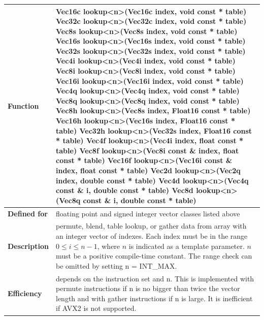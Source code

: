 \documentclass[vcl_manual.tex]{subfiles}
\begin{document}
\begin{tabular}{|p{30mm}|p{120mm}|}
\hline
\bfseries Function &
Vec16c lookup\textless n\textgreater(Vec16c index, void const * table) \newline
Vec32c lookup\textless n\textgreater(Vec32c index, void const * table) \newline
Vec8s lookup\textless n\textgreater(Vec8s index, void const * table) \newline
Vec16s lookup\textless n\textgreater(Vec16s index, void const * table) \newline
Vec32s lookup\textless n\textgreater(Vec32s index, void const * table) \newline
Vec4i lookup\textless n\textgreater(Vec4i index, void const * table) \newline
Vec8i lookup\textless n\textgreater(Vec8i index, void const * table) \newline
Vec16i lookup\textless n\textgreater(Vec16i index, void const * table) \newline
Vec4q lookup\textless n\textgreater(Vec4q index, void const * table) \newline
Vec8q lookup\textless n\textgreater(Vec8q index, void const * table) \newline
Vec8h lookup\textless n\textgreater(Vec8s index, Float16 const * table) \newline
Vec16h lookup\textless n\textgreater(Vec16s index, Float16 const * table) \newline
Vec32h lookup\textless n\textgreater(Vec32s index, Float16 const * table) \newline
Vec4f lookup\textless n\textgreater(Vec4i index, float const * table) \newline
Vec8f lookup\textless n\textgreater(Vec8i const \& index, float const * table) \newline
Vec16f lookup\textless n\textgreater(Vec16i const \& index, float const * table) \newline
Vec2d lookup\textless n\textgreater(Vec2q index, double const * table) \newline
Vec4d lookup\textless n\textgreater(Vec4q const \& i, double const * table) \newline
Vec8d lookup\textless n\textgreater(Vec8q const \& i, double const * table) \\ \hline
\bfseries Defined for & floating point and signed integer vector classes listed above \\ \hline
\bfseries Description & permute, blend, table lookup, or gather data from array with an integer vector of indexes.\newline
Each index must be in the range  $0 \leq i \leq n-1$, where $n$ is indicated as a template parameter. $n$ must be a positive compile-time constant. 
The range check can be omitted by setting n = INT\_MAX. \\ \hline
\bfseries Efficiency & depends on the instruction set and n.
This is implemented with permute instructions if n is no bigger than twice the vector length and with gather instructions if n is large. It is inefficient if AVX2 is not supported. \\ \hline
\end{tabular}
\end{document}
